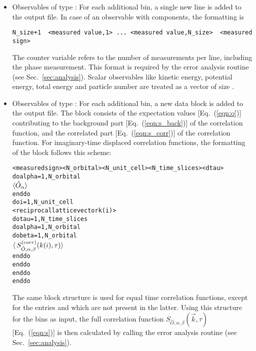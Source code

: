 \documentclass{SciPost}
\begin{document}
\begin{itemize}
\item Observables of type :
For each additional bin, a single new line is added to the output file.
In case of an observable with  components, the formatting is 
\begin{verbatim}
N_size+1  <measured value,1> ... <measured value,N_size>  <measured sign>
\end{verbatim}
The counter variable  refers to the number of measurements per line, including the phase measurement. 
This format is required by the error analysis routine (see Sec.~\ref{sec:analysis}). 
Scalar observables like kinetic energy, potential energy, total energy and particle number are treated as a vector 
of size .

\item Observables of type :
For each additional bin, a new data block is added to the output file. 
The block consists of the expectation values [Eq.~(\ref{eqn:o})] contributing to the background part [Eq.~(\ref{eqn:s_back})] of the correlation function,
and the correlated part [Eq.~(\ref{eqn:s_corr})] of the correlation function.
For imaginary-time displaced correlation functions, the formatting of the block follows this scheme:
\begin{alltt}
<measured sign>  <N_orbital>  <N_unit_cell> <N_time_slices> <dtau>
do alpha = 1, N_orbital
    \(\langle\hat{O}\sb{\alpha}\rangle \)
enddo
do i = 1, N_unit_cell
   <reciprocal lattice vector k(i)>
   do tau = 1, N_time_slices
      do alpha = 1, N_orbital
         do beta = 1, N_orbital
            \(\langle\,S\sb{\hat{O},\alpha,\beta}\sp{(corr)}(k(i),\tau)\rangle\)
         enddo
      enddo
   enddo
enddo
\end{alltt}
The same block structure is used for equal time correlation functions, except for the entries   and  
which are not present in the latter.
Using this structure for the bins as input,
the full correlation function $S_{\hat{O},\alpha,\beta}(\vec{k},\tau)$ [Eq.~(\ref{eqn:s})] is then calculated by calling the error analysis routine (see Sec.~\ref{sec:analysis}).
\end{itemize}

%
\end{document}

